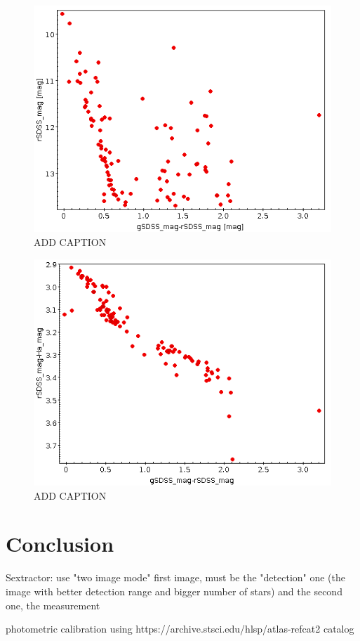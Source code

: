 \documentclass{aa}
\begin{document}
    \begin{figure}[H]
        \centering
        \includegraphics[width=0.8\linewidth]{Images/HRdiagram_rg.png}
        \caption{ADD CAPTION}
        \label{fig:my_label}
    \end{figure}
    \begin{figure}[H]
        \centering
        \includegraphics[width=0.8\linewidth]{Images/HRdiagram_rgH.png}
        \caption{ADD CAPTION}
        \label{fig:my_label}
    \end{figure}
    \section{Conclusion}\label{sec: Conclusion}
    
   Sextractor: use "two image mode" first image, must be the "detection" one (the image with better detection range and bigger number of stars) and the second one, the measurement

   photometric calibration using https://archive.stsci.edu/hlsp/atlas-refcat2 catalog

%
\nocite{*}


\end{document}

